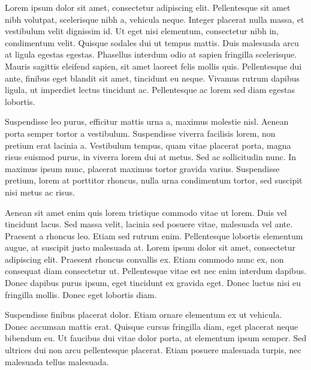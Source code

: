 
Lorem ipsum dolor sit amet, consectetur adipiscing elit. Pellentesque sit amet nibh volutpat, scelerisque nibh a, vehicula neque. Integer placerat nulla massa, et vestibulum velit dignissim id. Ut eget nisi elementum, consectetur nibh in, condimentum velit. Quisque sodales dui ut tempus mattis. Duis malesuada arcu at ligula egestas egestas. Phasellus interdum odio at sapien fringilla scelerisque. Mauris sagittis eleifend sapien, sit amet laoreet felis mollis quis. Pellentesque dui ante, finibus eget blandit sit amet, tincidunt eu neque. Vivamus rutrum dapibus ligula, ut imperdiet lectus tincidunt ac. Pellentesque ac lorem sed diam egestas lobortis.

Suspendisse leo purus, efficitur mattis urna a, maximus molestie nisl. Aenean porta semper tortor a vestibulum. Suspendisse viverra facilisis lorem, non pretium erat lacinia a. Vestibulum tempus, quam vitae placerat porta, magna risus euismod purus, in viverra lorem dui at metus. Sed ac sollicitudin nunc. In maximus ipsum nunc, placerat maximus tortor gravida varius. Suspendisse pretium, lorem at porttitor rhoncus, nulla urna condimentum tortor, sed suscipit nisi metus ac risus.

Aenean sit amet enim quis lorem tristique commodo vitae ut lorem. Duis vel tincidunt lacus. Sed massa velit, lacinia sed posuere vitae, malesuada vel ante. Praesent a rhoncus leo. Etiam sed rutrum enim. Pellentesque lobortis elementum augue, at suscipit justo malesuada at. Lorem ipsum dolor sit amet, consectetur adipiscing elit. Praesent rhoncus convallis ex. Etiam commodo nunc ex, non consequat diam consectetur ut. Pellentesque vitae est nec enim interdum dapibus. Donec dapibus purus ipsum, eget tincidunt ex gravida eget. Donec luctus nisi eu fringilla mollis. Donec eget lobortis diam.

Suspendisse finibus placerat dolor. Etiam ornare elementum ex ut vehicula. Donec accumsan mattis erat. Quisque cursus fringilla diam, eget placerat neque bibendum eu. Ut faucibus dui vitae dolor porta, at elementum ipsum semper. Sed ultrices dui non arcu pellentesque placerat. Etiam posuere malesuada turpis, nec malesuada tellus malesuada.